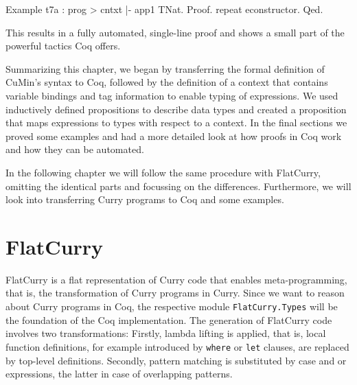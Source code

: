 \documentclass[fleqn, abstract=on]{scrreprt}
\newcommand{\todo}[1]{\marginpar{\textbf{TODO:} #1}}
\begin{document}
\begin{coqcode}
Example t7a : prog > cntxt |- app1 \in TNat.
Proof.
  repeat econstructor.
Qed.
\end{coqcode}
This results in a fully automated, single-line proof and shows a small part of the powerful tactics Coq offers.
\par
Summarizing this chapter, we began by transferring the formal definition of CuMin's syntax to Coq, followed by the definition of a context that contains variable bindings and tag information to enable typing of expressions. We used inductively defined propositions to describe data types and created a proposition that maps expressions to types with respect to a context. In the final sections we proved some examples and had a more detailed look at how proofs in Coq work and how they can be automated.
\par
In the following chapter we will follow the same procedure with FlatCurry, omitting the identical parts and focussing on the differences. Furthermore, we will look into transferring Curry programs to Coq and some examples.
\chapter{FlatCurry}
FlatCurry is a flat representation of Curry code that enables meta-programming, that is, the transformation of Curry programs in Curry.\cite{kics2manual} Since we want to reason about Curry programs in Coq, the respective module \texttt{FlatCurry.Types} will be the foundation of the Coq implementation. The generation of FlatCurry code involves two transformations: Firstly, lambda lifting is applied, that is, local function definitions, for example introduced by \texttt{where} or \texttt{let} clauses, are replaced by top-level definitions. Secondly, pattern matching is substituted by case and or expressions, the latter in case of overlapping patterns.
\par
\todo{Kapitelüberblick}
\end{document}
